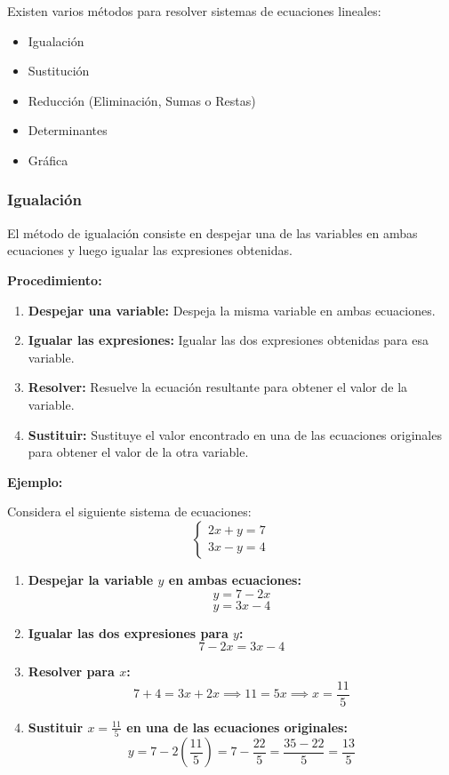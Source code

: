     Existen varios métodos para resolver sistemas de ecuaciones lineales:
    
    \begin{itemize}
    \item Igualación
    \item Sustitución
    \item Reducción (Eliminación, Sumas o Restas)
    \item Determinantes
    \item Gráfica
    \end{itemize}
    
    \subsubsection{Igualación}
    
    El método de igualación consiste en despejar una de las variables en ambas ecuaciones y luego igualar las expresiones obtenidas.
    
    \textbf{Procedimiento:}
    \begin{enumerate}
        \item \textbf{Despejar una variable:} Despeja la misma variable en ambas ecuaciones.
        \item \textbf{Igualar las expresiones:} Igualar las dos expresiones obtenidas para esa variable.
        \item \textbf{Resolver:} Resuelve la ecuación resultante para obtener el valor de la variable.
        \item \textbf{Sustituir:} Sustituye el valor encontrado en una de las ecuaciones originales para obtener el valor de la otra variable.
    \end{enumerate}
    
    \textbf{Ejemplo:}
    
    Considera el siguiente sistema de ecuaciones:
    \[
    \begin{cases}
    2x + y = 7 \\
    3x - y = 4
    \end{cases}
    \]
    
    \begin{enumerate}
        \item \textbf{Despejar la variable \(y\) en ambas ecuaciones:}
            \[
            y = 7 - 2x
            \]
            \[
            y = 3x - 4
            \]
        \item \textbf{Igualar las dos expresiones para \(y\):}
            \[
            7 - 2x = 3x - 4
            \]
        \item \textbf{Resolver para \(x\):}
            \[
            7 + 4 = 3x + 2x \implies 11 = 5x \implies x = \frac{11}{5}
            \]
        \item \textbf{Sustituir \(x = \frac{11}{5}\) en una de las ecuaciones originales:}
            \[
            y = 7 - 2 \left(\frac{11}{5}\right) = 7 - \frac{22}{5} = \frac{35 - 22}{5} = \frac{13}{5}
            \]
    \end{enumerate}
    
